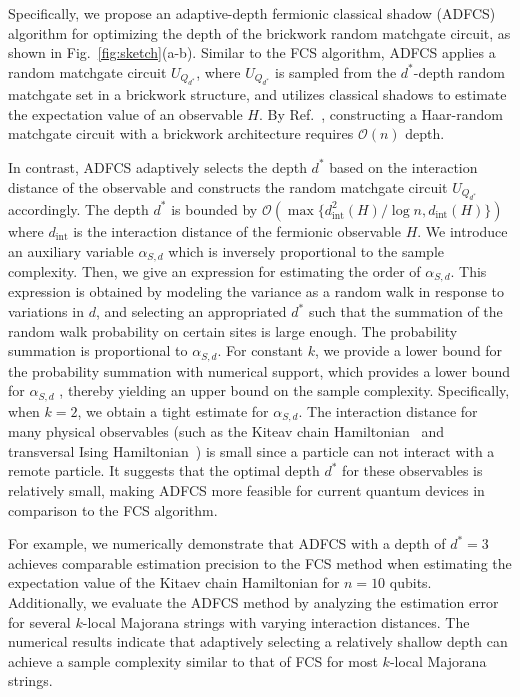 \documentclass[showpacs,twocolumn,aps,prx,long bibliography,superscriptaddress,notitlepage]{revtex4-1}
\newcommand{\cbra}[1]{\{ #1 \}}
\newcommand{\Ord}[1]{\mathcal{O}\left( #1 \right)}
\begin{document}
Specifically, we propose an adaptive-depth fermionic classical shadow (ADFCS) algorithm for optimizing the depth of the brickwork random matchgate circuit, as shown in Fig.~\ref{fig:sketch}(a-b). 
Similar to the FCS algorithm, ADFCS applies a random matchgate circuit $U_{Q_{d^\ast}}$, where $U_{Q_{d^\ast}}$ is sampled from the $d^\ast$-depth random matchgate set in a brickwork structure, and utilizes classical shadows to estimate the expectation value of an observable $H$. 
By Ref.~\cite{Jiang18Quantum}, constructing a Haar-random matchgate circuit with a brickwork architecture requires $\mathcal{O}(n)$ depth. 

In contrast, ADFCS adaptively selects the depth $d^\ast$ based on the interaction distance of the observable and constructs the random matchgate circuit $U_{Q_{d^\ast}}$ accordingly.
The depth $d^\ast$ is {bounded by} $\Ord{\max\cbra{d^2_{\text{int}}(H)/\log n, d_{\text{int}}(H)}}$ where $d_{\text{int}}$ is the interaction distance of the fermionic observable $H$. 
We introduce an auxiliary variable $\alpha_{S,d}$ which is inversely proportional to the sample complexity. Then, we give an expression for estimating the order of $\alpha_{S,d}$.
This expression is obtained by modeling the variance as a random walk in response to variations in $d$, and selecting an appropriated $d^\ast$ such that the summation of the random walk probability on certain sites is large enough. 
The probability summation is proportional to $\alpha_{S,d}$.
For constant \( k \), we provide a lower bound for the probability summation with numerical support, which provides a lower bound for $\alpha_{S,d}$ , thereby yielding an upper bound on the sample complexity. Specifically, when \( k = 2 \), we obtain a tight estimate for \( \alpha_{S,d} \).
The interaction distance for many physical observables (such as the Kiteav chain Hamiltonian~\cite{greiter20141d, borla2021gauging} and transversal Ising Hamiltonian~\cite{greiter20141d, marsolais2021equivalence}) is small since a particle can not interact with a remote particle. It suggests that the optimal depth $d^\ast$ for these observables is relatively small, making ADFCS more feasible for current quantum devices in comparison to the FCS algorithm. 


For example, we numerically demonstrate that ADFCS with a depth of $d^\ast = 3$ achieves comparable estimation precision to the FCS method when estimating the expectation value of the Kitaev chain Hamiltonian for $n=10$ qubits. 
Additionally, we evaluate the ADFCS method by analyzing the estimation error for several $k$-local  Majorana strings with varying interaction distances. The numerical results indicate that adaptively selecting a relatively shallow depth can achieve a sample complexity similar to that of FCS for most $k$-local Majorana strings.
\end{document}

